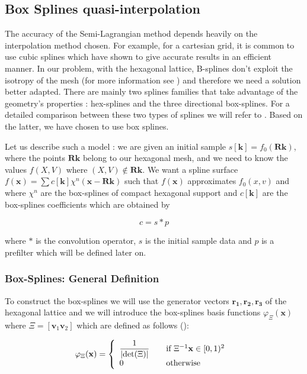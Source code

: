 \documentclass[proc]{edpsmath}
\begin{document}
\subsection{Box Splines quasi-interpolation}

The accuracy of the Semi-Lagrangian method depends heavily on the interpolation method chosen. For example, for a cartesian grid, it is common to use cubic splines which have shown to give accurate results in an efficient manner. In our problem, with the hexagonal lattice, B-splines don't exploit the isotropy of the mesh (for more information see \cite{Mersereau79-IEEE}) and therefore we need a solution better adapted.  There are mainly two splines families that take advantage of the geometry's properties : hex-splines and the three directional box-splines. For a detailed comparison between these two types of splines we will refer to \cite{Condat2007}. Based on the latter, we have chosen to use box splines.

Let us describe such a model : we are given an initial sample $s[\mathbf{k}] = f_0(\mathbf{R} \mathbf{k})$, where the points $\mathbf{R} \mathbf{k}$ belong to our hexagonal mesh, and we need to know the values $f(X,V)$ where $(X,V) \notin \mathbf{R} \mathbf{k}$. We want a spline surface $f(\mathbf{x}) = \sum c[\mathbf{k}] \chi^n(\mathbf{x} - \mathbf{R}\mathbf{k})$ such that $f(\mathbf{x})$ approximates $f_0(x,v)$ and where $\chi^n$ are the box-splines of compact hexagonal support and $c[\mathbf{k}]$ are the box-splines coefficients which are obtained by \cite{Condat2006a}

\begin{equation}
\label{eqn:coefs}
 c = s * p
\end{equation}

where $*$ is the convolution operator, $s$ is the initial sample data and $p$ is a prefilter which will be defined later on.

\subsubsection{Box-Splines: General Definition}
To construct the box-splines we will use the generator vectors $\mathbf{r_1, r_2, r_3}$ of the hexagonal lattice and we will introduce the box-splines basis functions $\varphi_{\Xi}(\mathbf{x})$ where $\Xi = [\mathbf{v}_1 \mathbf{v}_2]$ which are defined as follows (\cite{Condat2006, Boor1993}):

\begin{equation}
	\varphi_{\Xi} (\mathbf{x}) = \left\{
  	\begin{array}{l l}
    \dfrac{1}{\lvert \det(\Xi)\rvert} & \quad \text{if $\Xi^{-1}\mathbf{x} \in [0,1)^2$ }\\
    0 & \quad \text{otherwise}
  	\end{array} \right.
\end{equation}
\end{document}
